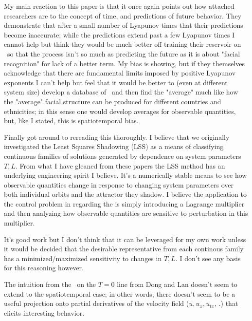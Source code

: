 \begin{description}
{\begin{description}
My main reaction to this paper is that it once again points
out how attached researchers are to the concept of time, and predictions of future behavior. They demonstrate that
after a small number of Lyapunov times that their predictions become inaccurate; while the predictions extend
past a few Lyapunov times I cannot help but think they
would be much better off training their reservoir on \twots\ so that the process isn't so much as predicting the
future as it is about "facial recognition" for lack of a better term. My bias is showing, but if they themselves acknowledge that there are fundamental limits imposed by
positive Lyapunov exponents I can't help but feel that it would be better to (even at different system size) develop a database of \twots\ and then find the "average" much like
how the "average" facial structure can be produced for different countries and ethnicities; in this sense one would develop averages for observable quantities, but, like
I stated, this is spatiotemporal bias.

\item[Least Square Shadowing]
Finally got around to rereading this thoroughly. I believe that we
originally investigated the Least Squares Shadowing (LSS)
 as a means of classifying continuous
families of solutions generated by dependence on system parameters $T,L$.
From what I have gleaned from these papers the LSS method has an
underlying engineering spirit I believe. It's a numerically stable means
to see how observable quantities change in response to changing system
parameters over both individual orbits and the attractor they shadow. I
believe the application to the control problem in 
regarding the \KSe is simply introducing a Lagrange multiplier and then
analyzing how observable quantities are sensitive to perturbation in this
multiplier.

It's good work but I don't think that it can be leveraged for my own work unless it would be decided that the desirable representative from each continous family has a minimized/maximized sensitivity to changes in $T,L$. I don't see any basis for this reasoning however.

\item[Partial derivative plotting and symbolic dynamics]
The intuition from the \KSe\ on the $T=0$ line from Dong and
Lan doesn't seem to extend to the spatiotemporal case; in
other words, there doesn't seem to be a useful projection onto partial
derivatives of the velocity field ($u,u_x,u_{tx}$, \etc.) that elicits
interesting behavior.


\end{description}}
\end{description}
